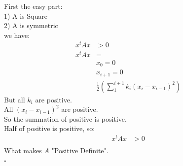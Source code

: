 \documentclass{article}
\begin{document}
	First the easy part:\\
	1) A is Square\\
	2) A is symmetric\\  we have:
	\begin{align*}
		x^tAx &> 0\\
		x^tAx &= \\
		&x_0 = 0\\
		&x_{i+1} = 0\\
		&\frac{1}{2}(\sum_{1}^{i+1}{k_i(x_i-x_{i-1})^2})
	\end{align*}
	But all $k_i$ are positive.\\
	All $(x_i-x_{i-1})^2$ are positive.\\
	So the summation of positive is positive.\\
	Half of positive is positive, so:
	\begin{align*}
		x^tAx &> 0\\
	\end{align*}
	What makes $A$ "Positive Definite".\\
	$\square$
\end{document}

